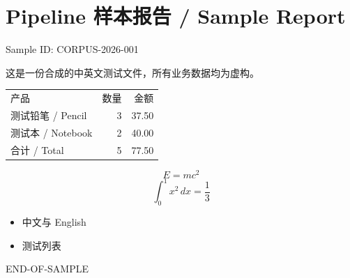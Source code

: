 \documentclass{article}
\begin{document}
\section{Pipeline 样本报告 / Sample Report}
Sample ID: CORPUS-2026-001

这是一份合成的中英文测试文件，所有业务数据均为虚构。
\begin{tabular}{lrr}
产品 & 数量 & 金额 \\
测试铅笔 / Pencil & 3 & 37.50 \\
测试本 / Notebook & 2 & 40.00 \\
合计 / Total & 5 & 77.50 \\
\end{tabular}
\[ E = mc^2 \]
\begin{equation} \int_0^1 x^2\,dx = \frac{1}{3} \end{equation}
\begin{itemize}\item 中文与 English\item 测试列表\end{itemize}
END-OF-SAMPLE
\end{document}
